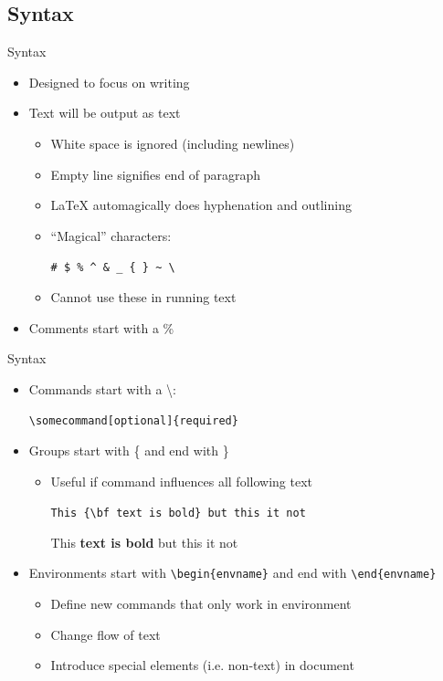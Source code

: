 \documentclass{beamer}
\begin{document}
\subsection{Syntax}
\begin{frame}[fragile]{Syntax}
    \begin{itemize}
        \item Designed to focus on writing
        \item Text will be output as text
              \begin{itemize}
                  \item White space is ignored (including newlines)
                  \item Empty line signifies end of paragraph
                  \item \LaTeX{} automagically does hyphenation and outlining
                  \item ``Magical'' characters:

                        \lstinline+# $ % ^ & _ { } ~ \+  %
                  \item Cannot use these in running text
              \end{itemize}
        \item Comments start with a \%
    \end{itemize}
\end{frame}

\begin{frame}[fragile]{Syntax}
    \begin{itemize}
        \item Commands start with a \textbackslash:

              \lstinline+\somecommand[optional]{required}+
        \item Groups start with \{ and end with \}
              \begin{itemize}
                  \item Useful if command influences all following text

                        \lstinline+This {\bf text is bold} but this it not+

                        This {\bf text is bold} but this it not
              \end{itemize}
        \item Environments start with \lstinline+\begin{envname}+ and end with
              \lstinline+\end{envname}+
              \begin{itemize}
                  \item Define new commands that only work in environment
                  \item Change flow of text
                  \item Introduce special elements (i.e. non-text) in
                        document
              \end{itemize}
    \end{itemize}
\end{frame}
\end{document}
